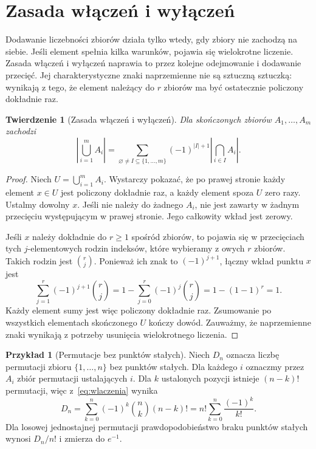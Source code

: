 \documentclass[11pt,a4paper,oneside]{report}
\numberwithin{equation}{chapter}
\theoremstyle{plain}
\newtheorem{twierdzenie}{Twierdzenie}[chapter]
\theoremstyle{definition}
\newtheorem{przyklad}{Przykład}[chapter]
\theoremstyle{remark}
\begin{document}
\section{Zasada włączeń i wyłączeń}
Dodawanie liczebności zbiorów działa tylko wtedy, gdy zbiory
nie zachodzą na siebie. Jeśli element spełnia kilka warunków,
pojawia się wielokrotne liczenie. Zasada włączeń i wyłączeń
naprawia to przez kolejne odejmowanie i dodawanie przecięć.
Jej charakterystyczne znaki naprzemienne nie są sztuczną sztuczką:
wynikają z tego, że element należący do $r$ zbiorów ma być
ostatecznie policzony dokładnie raz.

\begin{twierdzenie}[Zasada włączeń i wyłączeń]
Dla skończonych zbiorów $A_1,\ldots,A_m$ zachodzi
\begin{equation}\label{eq:wlaczenia}
\left|\bigcup_{i=1}^m A_i\right|
=\sum_{\varnothing\ne I\subseteq\{1,\ldots,m\}}
 (-1)^{|I|+1}\left|\bigcap_{i\in I}A_i\right|.
\end{equation}
\end{twierdzenie}
\begin{proof}
Niech $U=\bigcup_{i=1}^m A_i$. Wystarczy pokazać, że
po prawej stronie każdy element $x\in U$ jest policzony
dokładnie raz, a każdy element spoza $U$ zero razy.
Ustalmy dowolny $x$. Jeśli nie należy do żadnego $A_i$,
nie jest zawarty w żadnym przecięciu występującym
w prawej stronie. Jego całkowity wkład jest zerowy.

Jeśli $x$ należy dokładnie do $r\geq1$ spośród zbiorów,
to pojawia się w przecięciach tych $j$-elementowych
rodzin indeksów, które wybieramy z owych $r$ zbiorów.
Takich rodzin jest $\binom rj$. Ponieważ ich znak to
$(-1)^{j+1}$, łączny wkład punktu $x$ jest
\[
\sum_{j=1}^r(-1)^{j+1}\binom rj
=1-\sum_{j=0}^r(-1)^j\binom rj
=1-(1-1)^r=1.
\]
Każdy element sumy jest więc policzony dokładnie raz.
Zsumowanie po wszystkich elementach skończonego $U$
kończy dowód. Zauważmy, że naprzemienne znaki wynikają
z potrzeby usunięcia wielokrotnego liczenia.
\end{proof}

\begin{przyklad}[Permutacje bez punktów stałych]
Niech $D_n$ oznacza liczbę permutacji zbioru $\{1,\ldots,n\}$ bez punktów
stałych. Dla każdego $i$ oznaczmy przez $A_i$ zbiór permutacji
ustalających $i$. Dla $k$ ustalonych pozycji istnieje $(n-k)!$ permutacji,
więc z~\eqref{eq:wlaczenia} wynika
\[
D_n=\sum_{k=0}^{n}(-1)^k\binom nk(n-k)!
=n!\sum_{k=0}^{n}\frac{(-1)^k}{k!}.
\]
Dla losowej jednostajnej permutacji prawdopodobieństwo braku punktów
stałych wynosi $D_n/n!$ i zmierza do $e^{-1}$.
\end{przyklad}
\end{document}
